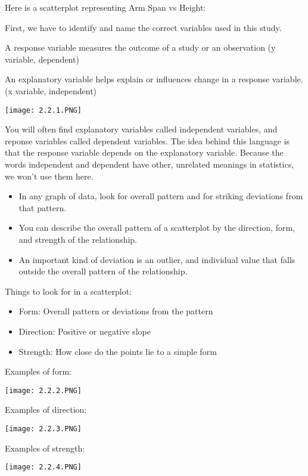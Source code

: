 \documentclass[../stats.tex]{subfiles}
\begin{document}
Here is a scatterplot representing Arm Span vs Height:

First, we have to identify and name the correct variables used in this study.

A response variable measures the outcome of a study or an observation (y variable, dependent)

An explanatory variable helps explain or influences change in a response variable. (x variable, independent)
\begin{center}
    \texttt{[image: 2.2.1.PNG]}
\end{center}
You will often find explanatory variables called independent variables, and reponse variables called dependent variables.
The idea behind this language is that the response variable depends on the explanatory variable.
Because the words independent and dependent have other, unrelated meanings in statistics, we won't use them here.

\begin{itemize}
    \item In any graph of data, look for overall pattern and for striking deviations from that pattern.
    \item You can describe the overall pattern of a scatterplot by the direction, form, and strength of the relationship.
    \item An important kind of deviation is an outlier, and individual value that falls outside the overall pattern of the relationship.
\end{itemize}
Things to look for in a scatterplot:
\begin{itemize}
    \item Form: Overall pattern or deviations from the pattern 
    \item Direction: Positive or negative slope 
    \item Strength: How close do the points lie to a simple form 
\end{itemize}

Examples of form:
\begin{center}
    \texttt{[image: 2.2.2.PNG]}
\end{center}

Examples of direction:
\begin{center}
    \texttt{[image: 2.2.3.PNG]}
\end{center}

Examples of strength:
\begin{center}
    \texttt{[image: 2.2.4.PNG]}
\end{center}
\end{document}
